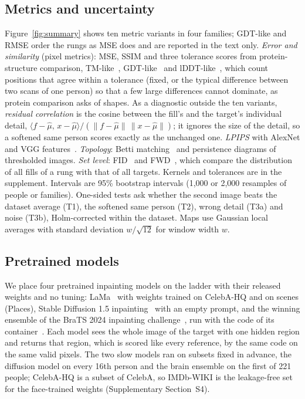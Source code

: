 \subsection{Metrics and uncertainty}
Figure~\ref{fig:summary} shows ten metric variants in four families; \ac{GDT}-like and \ac{RMSE} order the rungs as \ac{MSE} does and are reported in the text only.
\emph{Error and similarity} (pixel metrics): \ac{MSE}, \ac{SSIM} and three tolerance scores from protein-structure comparison, \ac{TM}-like~\cite{tmscore2004}, \ac{GDT}-like~\cite{zemla2003lga} and \ac{lDDT}-like~\cite{lddt2013}, which count positions that agree within a tolerance (fixed, or the typical difference between two scans of one person) so that a few large differences cannot dominate, as protein comparison asks of shapes.
As a diagnostic outside the ten variants, \emph{residual correlation} is the cosine between the fill's and the target's individual detail, $\langle f-\hat\mu,\,x-\hat\mu\rangle/(\|f-\hat\mu\|\,\|x-\hat\mu\|)$; it ignores the size of the detail, so a softened same person scores exactly as the unchanged one.
\emph{\acs{LPIPS}} with AlexNet and VGG features~\cite{zhang2018lpips}.
\emph{Topology}: Betti matching~\cite{betti2023} and persistence diagrams of thresholded images.
\emph{Set level}: \ac{FID}~\cite{heusel2017fid} and \ac{FWD}~\cite{fwd2025}, which compare the distribution of all fills of a rung with that of all targets.
Kernels and tolerances are in the supplement.
Intervals are 95\% bootstrap intervals (1{,}000 or 2{,}000 resamples of people or families).
One-sided tests ask whether the second image beats the dataset average (T1), the softened same person (T2), wrong detail (T3a) and noise (T3b), Holm-corrected within the dataset.
Maps use Gaussian local averages with standard deviation $w/\sqrt{12}$ for window width $w$.

\subsection{Pretrained models}
\label{sec:m-models}
We place four pretrained inpainting models on the ladder with their released weights and no tuning: LaMa~\cite{lama2022} with weights trained on CelebA-HQ and on scenes (Places), Stable Diffusion 1.5 inpainting~\cite{rombach2022ldm} with an empty prompt, and the winning ensemble of the \ac{BraTS} 2024 inpainting challenge~\cite{brats2024winner}, run with the code of its container~\cite{bratsorch2025}.
Each model sees the whole image of the target with one hidden region and returns that region, which is scored like every reference, by the same code on the same valid pixels.
The two slow models ran on subsets fixed in advance, the diffusion model on every 16th person and the brain ensemble on the first \mfBratsQtimN{} of 221 people; CelebA-HQ is a subset of CelebA, so IMDb-WIKI is the leakage-free set for the face-trained weights (Supplementary Section~S4).

